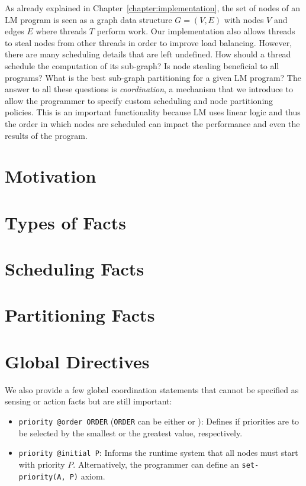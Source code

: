 As already explained in Chapter~\ref{chapter:implementation}, the set of nodes
of an LM program is seen as a graph data structure $G = (V, E)$ with nodes $V$
and edges $E$ where threads $T$ perform work. Our implementation also allows
threads to steal nodes from other threads in order to improve load balancing.
However, there are many scheduling details that are left undefined. How should a
thread schedule the computation of its sub-graph? Is node stealing beneficial to
all programs? What is the best sub-graph partitioning for a given LM program?
The answer to all these questions is \emph{coordination}, a mechanism that we
introduce to allow the programmer to specify custom scheduling and node
partitioning policies. This is an important functionality because LM uses linear
logic and thus the order in which nodes are scheduled can impact the performance
and even the results of the program.

\section{Motivation}\label{section:coord:rationale}



\section{Types of Facts}



\section{Scheduling Facts}\label{sec:coord:fifo}



\section{Partitioning Facts}


\section{Global Directives}

We also provide a few global coordination statements that cannot be specified
as sensing or action facts but are still important:

\begin{itemize}

   \item \texttt{priority @order ORDER} (\texttt{ORDER} can be either 
      or ): Defines if priorities are to be selected by the smallest
      or the greatest value, respectively.

   \item \texttt{priority @initial P}: Informs the runtime system that all nodes
      must start with priority $P$.  Alternatively, the programmer can define an
      \texttt{set-priority(A, P)} axiom.

\end{itemize}

